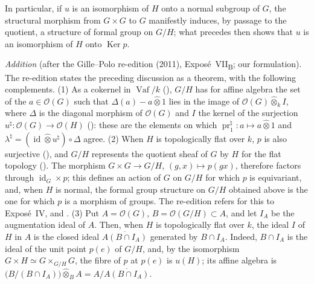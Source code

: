 In particular, if \(u\) is an isomorphism of \(H\) onto a normal
subgroup of \(G\), the structural morphism from \(G\times G\) to \(G\)
manifestly induces, by passage to the quotient, a structure of formal
group on \(G/H\); what precedes then shows that \(u\) is an isomorphism
of \(H\) onto \(\operatorname{Ker}p\).

\medskip\noindent
\emph{Addition} (after the Gille--Polo re-edition (2011),
Exposé~VII\textsubscript{B}; our formulation). The re-edition states the
preceding discussion as a theorem, with the following complements.
\textup{(1)} As a cokernel in \(\operatorname{Vaf}/k\)
\textup{()}, \(G/H\) has for affine algebra the set of the
\(a\in\mathcal O(G)\) such that \(\Delta(a)-a\widehat\otimes1\) lies in
the image of \(\mathcal O(G)\widehat\otimes_kI\), where \(\Delta\) is the
diagonal morphism of \(\mathcal O(G)\) and \(I\) the kernel of the
surjection \(u^\natural:\mathcal O(G)\to\mathcal O(H)\)
\textup{()}: these are the elements on which
\(\operatorname{pr}_1^\natural:a\mapsto a\widehat\otimes1\) and
\(\lambda^\natural=(\operatorname{id}\widehat\otimes u^\natural)\circ\Delta\)
agree. \textup{(2)} When \(H\) is topologically flat over \(k\), \(p\) is
also surjective \textup{()}, and \(G/H\) represents the quotient
sheaf of \(G\) by \(H\) for the flat topology \textup{()}. The
morphism \(G\times G\to G/H\), \((g,x)\mapsto p(gx)\), therefore factors
through \(\operatorname{id}_G\times p\); this defines an action of \(G\) on
\(G/H\) for which \(p\) is equivariant, and, when \(H\) is normal, the
formal group structure on \(G/H\) obtained above is the one for which \(p\)
is a morphism of groups. The re-edition refers for this to Exposé~IV,
 and . \textup{(3)} Put \(A=\mathcal O(G)\),
\(B=\mathcal O(G/H)\subset A\), and let \(I_A\) be the augmentation ideal of
\(A\). Then, when \(H\) is topologically flat over \(k\), the ideal \(I\) of
\(H\) in \(A\) is the closed ideal \(\overline{A(B\cap I_A)}\) generated by
\(B\cap I_A\). Indeed, \(B\cap I_A\) is the ideal of the unit point
\(p(e)\) of \(G/H\), and, by the isomorphism
\(G\times H\simeq G\times_{G/H}G\), the fibre of \(p\) at \(p(e)\) is
\(u(H)\); its affine algebra is
\(\bigl(B/(B\cap I_A)\bigr)\widehat\otimes_BA=A/\overline{A(B\cap I_A)}\).
